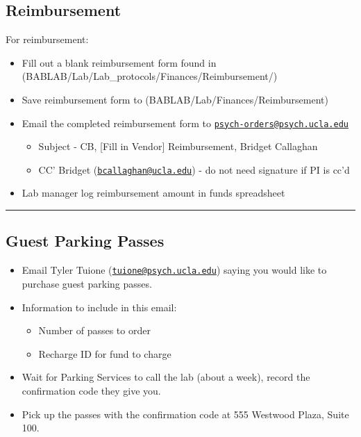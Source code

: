 \documentclass[]{book}
\providecommand{\tightlist}{%
  \setlength{\itemsep}{0pt}\setlength{\parskip}{0pt}}
\begin{document}
\hypertarget{reimbursement}{%
\subsection{Reimbursement}\label{reimbursement}}

For reimbursement:

\begin{itemize}
\tightlist
\item
  Fill out a blank reimbursement form found in (BABLAB/Lab/Lab\_protocols/Finances/Reimbursement/)
\item
  Save reimbursement form to (BABLAB/Lab/Finances/Reimbursement)
\item
  Email the completed reimbursement form to \href{mailto:psych-orders@psych.ucla.edu}{\nolinkurl{psych-orders@psych.ucla.edu}}

  \begin{itemize}
  \tightlist
  \item
    Subject - CB, {[}Fill in Vendor{]} Reimbursement, Bridget Callaghan
  \item
    CC' Bridget (\href{mailto:bcallaghan@ucla.edu}{\nolinkurl{bcallaghan@ucla.edu}}) - do not need signature if PI is cc'd
  \end{itemize}
\item
  Lab manager log reimbursement amount in funds spreadsheet
\end{itemize}

\begin{center}\rule{0.5\linewidth}{\linethickness}\end{center}

\hypertarget{guest-parking-passes}{%
\subsection{Guest Parking Passes}\label{guest-parking-passes}}

\begin{itemize}
\tightlist
\item
  Email Tyler Tuione (\href{mailto:tuione@psych.ucla.edu}{\nolinkurl{tuione@psych.ucla.edu}}) saying you would like to purchase guest parking passes.
\item
  Information to include in this email:

  \begin{itemize}
  \tightlist
  \item
    Number of passes to order
  \item
    Recharge ID for fund to charge
  \end{itemize}
\item
  Wait for Parking Services to call the lab (about a week), record the confirmation code they give you.
\item
  Pick up the passes with the confirmation code at 555 Westwood Plaza, Suite 100.
\end{itemize}
\end{document}
